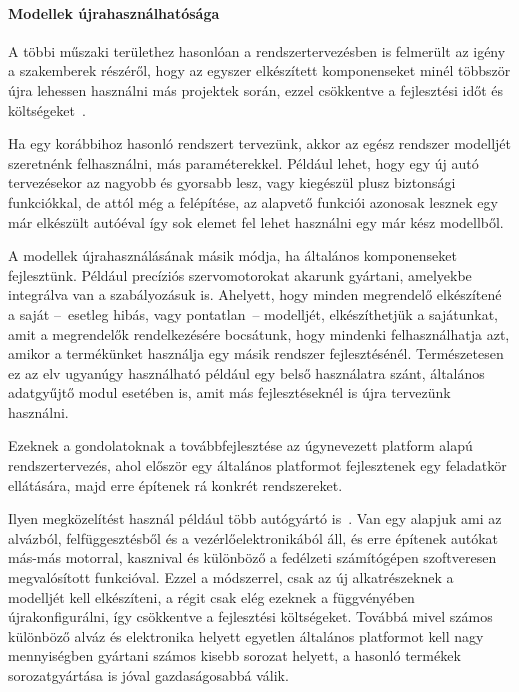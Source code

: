        \paragraph{Modellek újrahasználhatósága}
        A többi műszaki területhez hasonlóan a rendszertervezésben is felmerült az igény a szakemberek részéről, hogy az egyszer elkészített komponenseket minél többször újra lehessen használni más projektek során, ezzel csökkentve a fejlesztési időt és költségeket~\cite{Bajaj_2022}.
        
        Ha egy korábbihoz hasonló rendszert tervezünk, akkor az egész rendszer modelljét szeretnénk felhasználni, más paraméterekkel. Például lehet, hogy egy új autó tervezésekor az nagyobb és gyorsabb lesz, vagy kiegészül plusz biztonsági funkciókkal, de attól még a felépítése, az alapvető funkciói azonosak lesznek egy már elkészült autóéval így sok elemet fel lehet használni egy már kész modellből.

        A modellek újrahasználásának másik módja, ha általános komponenseket fejlesztünk. Például precíziós szervomotorokat akarunk gyártani, amelyekbe integrálva van a szabályozásuk is. Ahelyett, hogy minden megrendelő elkészítené a saját --~esetleg hibás, vagy pontatlan~-- modelljét, elkészíthetjük a sajátunkat, amit a megrendelők rendelkezésére bocsátunk, hogy mindenki felhasználhatja azt, amikor a termékünket használja egy másik rendszer fejlesztésénél.
        Természetesen ez az elv ugyanúgy használható például egy belső használatra szánt, általános adatgyűjtő modul esetében is, amit más fejlesztéseknél is újra tervezünk használni.

        Ezeknek a gondolatoknak a továbbfejlesztése az úgynevezett platform alapú rendszertervezés, ahol először egy általános platformot fejlesztenek egy feladatkör ellátására, majd erre építenek rá konkrét rendszereket.
        
        Ilyen megközelítést használ például több autógyártó is~\cite{Simpson_2006}. Van egy alapjuk ami az alvázból, felfüggesztésből és a vezérlőelektronikából áll, és erre építenek autókat más-más motorral, kasznival és különböző a fedélzeti számítógépen szoftveresen megvalósított funkcióval.
        Ezzel a módszerrel, csak az új alkatrészeknek a modelljét kell elkészíteni, a régit csak elég ezeknek a függvényében újrakonfigurálni, így csökkentve a fejlesztési költségeket. Továbbá mivel számos különböző alváz és elektronika helyett egyetlen általános platformot kell nagy mennyiségben gyártani számos kisebb sorozat helyett, a hasonló termékek sorozatgyártása is jóval gazdaságosabbá válik.
        
